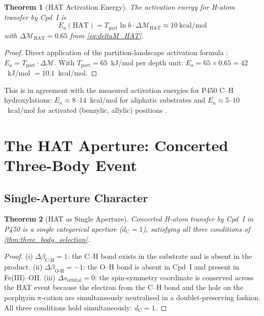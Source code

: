 \documentclass[11pt,twocolumn,a4paper]{article}
\newtheorem{theorem}{Theorem}[section]
\theoremstyle{definition}
\theoremstyle{remark}
\newcommand{\depth}{\mathcal{M}}
\newcommand{\dC}{d_{\mathrm{C}}}
\newcommand{\betaCH}{\beta_{\mathrm{C\text{-}H}}}
\newcommand{\betaOH}{\beta_{\mathrm{O\text{-}H}}}
\begin{document}
\begin{theorem}[HAT Activation Energy]
\label{thm:hat_Ea}
The activation energy for H-atom transfer by Cpd~I is
\begin{equation}
E_a(\mathrm{HAT}) = T_{\mathrm{part}} \ln b \cdot \Delta\depth_{\mathrm{HAT}} \approx 10~\mathrm{kcal/mol}
\label{eq:hat_Ea}
\end{equation}
with $\Delta\depth_{\mathrm{HAT}} = 0.65$ from \cref{eq:deltaM_HAT}.
\end{theorem}

\begin{proof}
Direct application of the partition-landscape activation formula
\citep{sachikonye2025_landscape}: $E_a = T_{\mathrm{part}} \cdot \Delta\depth$.
With $T_{\mathrm{part}} = 65$~kJ/mol per depth unit:
$E_a = 65 \times 0.65 = 42$~kJ/mol $= 10.1$~kcal/mol.
\end{proof}

This is in agreement with the measured activation energies for P450 C--H
hydroxylations: $E_a \approx 8$--$14$~kcal/mol for aliphatic substrates
and $E_a \approx 5$--$10$~kcal/mol for activated (benzylic, allylic) positions
\citep{shaik2010, groves1985}.

\section{The HAT Aperture: Concerted Three-Body Event}
\label{sec:hat_aperture}

\subsection{Single-Aperture Character}

\begin{theorem}[HAT as Single Aperture]
\label{thm:hat_single}
Concerted H-atom transfer by Cpd~I in P450 is a single categorical aperture
($\dC = 1$), satisfying all three conditions of \cref{thm:three_body_selection}.
\end{theorem}

\begin{proof}
(i) $\Delta\betaCH = 1$: the C--H bond exists in the substrate and is absent in
the product. (ii) $\Delta\betaOH = -1$: the O--H bond is absent in Cpd~I
and present in Fe(III)--OH. (iii) $\Delta s_{\mathrm{orbital}} = 0$: the
spin-symmetry coordinate is conserved across the HAT event because the
electron from the C--H bond and the hole on the porphyrin $\pi$-cation are
simultaneously neutralised in a doublet-preserving fashion. All three conditions
hold simultaneously: $\dC = 1$.
\end{proof}
\end{document}
